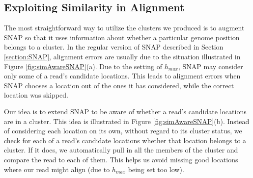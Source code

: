 \documentclass[twocolumn,10pt]{article}
\begin{document}
\subsection{Exploiting Similarity in Alignment}
\label{section:exploitingSimilarityInAlignment}

The most straightforward way to utilize the clusters we produced is to augment SNAP so that it uses information about whether a particular genome position belongs to a cluster.  In the regular version of SNAP described in Section \ref{section:SNAP}, alignment errors are usually due to the situation illustrated in Figure \ref{fig:simAwareSNAP}(a).  Due to the setting of \(h_{max}\), SNAP may consider only some of a read's candidate locations.  This leads to alignment errors when SNAP chooses a location out of the ones it has considered, while the correct location was skipped.

Our idea is to extend SNAP to be aware of whether a read's candidate locations are in a cluster.  This idea is illustrated in Figure \ref{fig:simAwareSNAP}(b).  Instead of considering each location on its own, without regard to its cluster status, we check for each of a read's candidate locations whether that location belongs to a cluster.  If it does, we automatically pull in all the members of the cluster and compare the read to each of them.  This helps us avoid missing good locations where our read might align (due to \(h_{max}\) being set too low).
\end{document}
